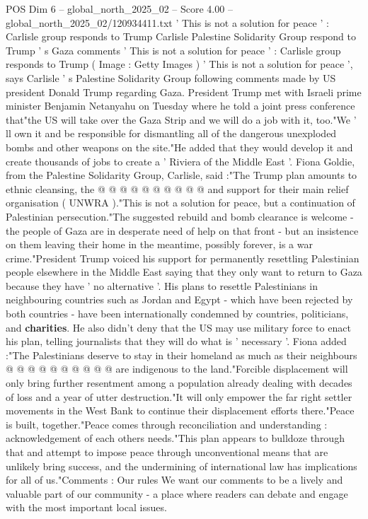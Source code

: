\begin{textsample}{POS Dim 6 – global\_north\_2025\_02 – Score 4.00 – global\_north\_2025\_02/120934411.txt}  \label{ex:f6_pos_368}
' This is not a solution for peace ' : Carlisle group responds to Trump Carlisle Palestine Solidarity Group respond to Trump ' s Gaza comments ' This is not a solution for peace ' : Carlisle group responds to Trump ( Image : Getty Images ) ' This is not a solution for peace ', says Carlisle ' s Palestine Solidarity Group following comments made by US president Donald Trump regarding Gaza.
President Trump met with Israeli prime minister Benjamin Netanyahu on Tuesday where he told a joint press conference that"the US will take over the Gaza Strip and we will do a job with it, too."We ' ll own it and be responsible for dismantling all of the dangerous unexploded bombs and other weapons on the site."He added that they would develop it and create thousands of jobs to create a ' Riviera of the Middle East '.
Fiona Goldie, from the Palestine Solidarity Group, Carlisle, said :"The Trump plan amounts to ethnic cleansing, the @ @ @ @ @ @ @ @ @ @ and support for their main relief organisation ( UNWRA )."This is not a solution for peace, but a continuation of Palestinian persecution."The suggested rebuild and bomb clearance is welcome - the people of Gaza are in desperate need of help on that front - but an insistence on them leaving their home in the meantime, possibly forever, is a war crime."President Trump voiced his support for permanently resettling Palestinian people elsewhere in the Middle East saying that they only want to return to Gaza because they have ' no alternative '.
His plans to resettle Palestinians in neighbouring countries such as Jordan and Egypt - which have been rejected by both countries - have been internationally condemned by countries, politicians, and \textbf{charities}.
He also didn't deny that the US may use military force to enact his plan, telling journalists that they will do what is ' necessary '.
Fiona added :"The Palestinians deserve to stay in their homeland as much as their neighbours @ @ @ @ @ @ @ @ @ @ are indigenous to the land."Forcible displacement will only bring further resentment among a population already dealing with decades of loss and a year of utter destruction."It will only empower the far right settler movements in the West Bank to continue their displacement efforts there."Peace is built, together."Peace comes through reconciliation and understanding : acknowledgement of each others needs."This plan appears to bulldoze through that and attempt to impose peace through unconventional means that are unlikely bring success, and the undermining of international law has implications for all of us."Comments : Our rules We want our comments to be a lively and valuable part of our community - a place where readers can debate and engage with the most important local issues.

\end{textsample}
